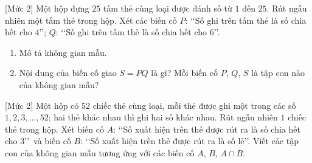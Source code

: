 \begin{bt}%
[Mức 2]
	Một hộp đựng $25$ tấm thẻ cùng loại được đánh số từ $1$ đến $25$. Rút ngẫu nhiên một tấm thẻ trong hộp. Xét các biến cố $P$: \lq\lq Số ghi trên tấm thẻ là số chia hết cho $4$\rq\rq; $Q$: \lq\lq Số ghi trên tấm thẻ là số chia hết cho $6$\rq\rq.
	\begin{enumerate}
		\item Mô tả không gian mẫu.
		\item Nội dung của biến cố giao $S=P Q$ là gì? Mỗi biến cố $P$, $Q$, $S$ là tập con nào của không gian mẫu?
	\end{enumerate} 
\end{bt}

\begin{bt}%
[Mức 2]
	Một hộp có $52$ chiếc thẻ cùng loại, mỗi thẻ được ghi một trong các số $1,2,3, \ldots, 52$; hai thẻ khác nhau thì ghi hai số khác nhau. Rút ngẫu nhiên $1$ chiếc thẻ trong hộp. Xét biến cố $A$: \lq\lq Số xuất hiện trên thẻ được rút ra là số chia hết cho 3\rq\rq \, và biến cố $B$: \lq\lq Số xuất hiện trên thẻ được rút ra là số lẻ\rq\rq. Viết các tập con của không gian mẫu tương ứng với các biến cố $A$, $B$, $A \cap B$.
\end{bt}

